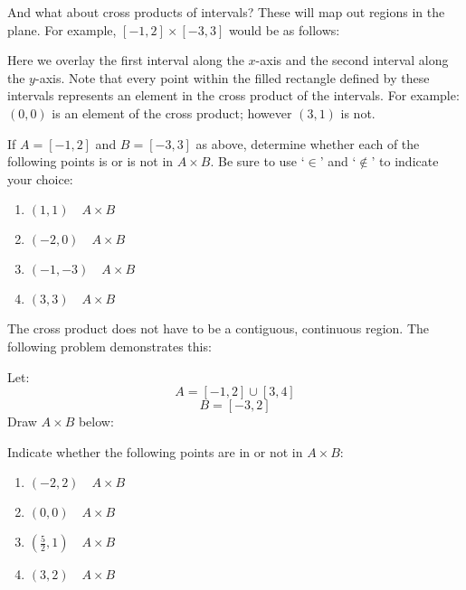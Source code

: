 \documentclass[letterpaper,12pt,fleqn]{article}
\begin{document}
And what about cross products of intervals? These will map out regions in the plane.
For example, $[-1,2]\times[-3,3]$ would be as follows:

\bigskip

\begin{minipage}{\textwidth}
  \centering
\end{minipage}

Here we overlay the first interval along the $x$-axis and the second interval along the
$y$-axis. Note that every point within the filled rectangle defined by these intervals
represents an element in the cross product of the intervals. For example: $(0,0)$ is
an element of the cross product; however $(3,1)$ is not.

If $A=[-1,2]$ and $B=[-3,3]$ as above, determine whether each of the following points
is or is not in $A\times B$. Be sure to use `$\in$' and `$\notin$' to indicate your
choice:
\begin{enumerate}
\item $(1,1)\quad A\times B$
\item $(-2,0)\quad A\times B$
\item $(-1,-3)\quad A\times B$
\item $(3,3)\quad A\times B$
\end{enumerate}

The cross product does not have to be a contiguous, continuous region. The following
problem demonstrates this:

Let:
\[A=[-1,2]\cup[3,4]\]
\[B=[-3,2]\]
Draw $A\times B$ below:

\bigskip

\begin{minipage}{\textwidth}
  \centering
\end{minipage}

\bigskip

Indicate whether the following points are in or not in $A\times B$:
\begin{enumerate}
\item $(-2,2)\quad A\times B$
\item $(0,0)\quad A\times B$
\item $(\frac{5}{2},1)\quad A\times B$
\item $(3,2)\quad A\times B$
\end{enumerate}
\end{document}
